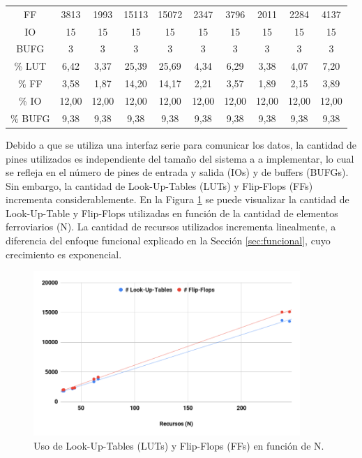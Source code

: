 \begin{table}[H]
{\begin{center}
{\begin{tabular}{ c c c c c c c c c c  }
						FF 				& 3813  & 1993  & 15113 & 15072 & 2347  & 3796  & 2011  & 2284  & 4137\\
						IO 				& 15    & 15    & 15    & 15    & 15    & 15    & 15    & 15    & 15\\
						BUFG 			& 3     & 3     & 3     & 3     & 3     & 3     & 3     & 3     & 3\\
						\hline
						\% LUT 			& 6,42  & 3,37  & 25,39 & 25,69 & 4,34  & 6,29  & 3,38  & 4,07  & 7,20\\
						\% FF 			& 3,58  & 1,87  & 14,20 & 14,17 & 2,21  & 3,57  & 1,89  & 2,15  & 3,89\\
						\% IO 			& 12,00 & 12,00 & 12,00 & 12,00 & 12,00 & 12,00 & 12,00 & 12,00 & 12,00\\
						\% BUFG 		& 9,38  & 9,38  & 9,38  & 9,38  & 9,38  & 9,38  & 9,38  & 9,38  & 9,38\\
					\end{tabular}
				}
			\end{center}
		}    
	\end{table}
	
	Debido a que se utiliza una interfaz serie para comunicar los datos, la cantidad de pines utilizados es independiente del tamaño del sistema a a implementar, lo cual se refleja en el número de pines de entrada y salida (IOs) y de buffers (BUFGs). Sin embargo, la cantidad de Look-Up-Tables (LUTs) y Flip-Flops (FFs) incrementa considerablemente. En la Figura \ref{fig:ACG_RECURSOS_1} se puede visualizar la cantidad de Look-Up-Table y Flip-Flops utilizadas en función de la cantidad de elementos ferroviarios (N). La cantidad de recursos utilizados incrementa linealmente, a diferencia del enfoque funcional explicado en la Sección \ref{sec:funcional}, cuyo crecimiento es exponencial.	
	 	
	\begin{figure}[H]
		\centering
		\includegraphics[origin = c, width=0.9\textwidth]{resultados-obtenidos/ejemplo1/images/recursos_1}
		\centering\caption{Uso de Look-Up-Tables (LUTs) y Flip-Flops (FFs) en función de N.}
		\label{fig:ACG_RECURSOS_1}
	\end{figure}
	
